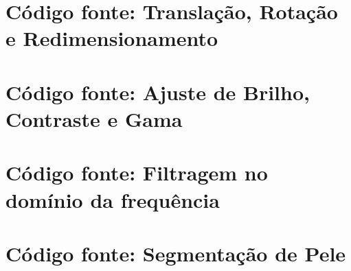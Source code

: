 \documentclass[
	article,			%
	11pt,				%
	oneside,			%
	a4paper,			%
	english,			%
	brazil,				%
	sumario=tradicional
	]{abntex2}
\newcommand{\matlabCodePath}{/home/clifte/git/Mestrado/Matlab/}
\begin{document}

\begin{apendicesenv} 

\chapter{Código fonte: Translação, Rotação e Redimensionamento}
\label{apend:transRotRed}

	
 	\lstset{extendedchars=true,inputencoding=utf8/latin1}
 	



\chapter{Código fonte: Ajuste de Brilho, Contraste e Gama}
\label{apend:contBriGama}

\lstset{extendedchars=true,inputencoding=utf8/latin1}








\chapter{Código fonte: Filtragem no domínio da frequência}
\label{apend:filtragemCod}
\lstset{extendedchars=true,inputencoding=utf8/latin1}


\chapter{Código fonte: Segmentação de Pele}
\label{apend:skinSegment}
\lstset{extendedchars=true,inputencoding=utf8/latin1}



\end{apendicesenv}



\end{document}
